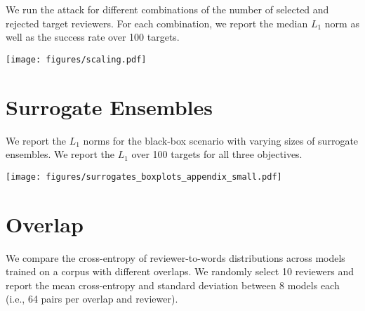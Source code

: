 \documentclass[letterpaper,twocolumn,10pt]{article}
\begin{document}
We run the attack for different combinations of the number of selected and rejected target reviewers. For each combination, we report the median $L_1$ norm as well as the success rate over 100 targets.

\begin{center}
    \texttt{[image: figures/scaling.pdf]}
\end{center}

\newpage
\section{Surrogate Ensembles}
\label{app:surrogate-boxplots}
\vspace{-0.5em}

We report the $L_1$ norms for the black-box scenario with varying sizes of surrogate ensembles. We report the $L_1$ over 100 targets for all three objectives.

\begin{center}
\texttt{[image: figures/surrogates\_boxplots\_appendix\_small.pdf]}  
\end{center}

\section{Overlap}
\label{app:cp-overlap}
\vspace{-0.5em}

We compare the cross-entropy of reviewer-to-words distributions across models trained on a corpus with different overlaps. We randomly select 10 reviewers and report the mean cross-entropy and standard deviation between 8 models each (i.e., 64 pairs per overlap and reviewer).
\end{document}

